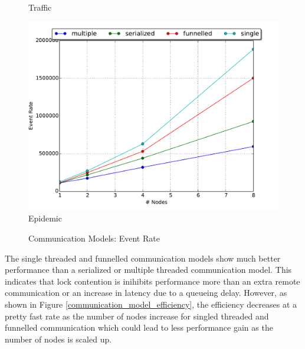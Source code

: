 \documentclass[11pt]{book}
\begin{document}
\begin{figure}
\begin{minipage}{.5\textwidth}
\begin{center}
      Traffic \\
    \end{center}
  \end{minipage}
  \centering
  \begin{minipage}{.5\textwidth}
    \begin{center}
      \includegraphics[width=\textwidth,keepaspectratio,quiet]{figs/partitioning_communication/communication_epidemic_eventrate.pdf} \\
      Epidemic \\
    \end{center}
  \end{minipage}
  \caption{Communication Models: Event Rate}\label{communication_model_eventrate}
\end{figure}

The single threaded and funnelled communication models show much better performance than a
serialized or multiple threaded communication model.  This indicates that lock contention is
inihibits performance more than an extra remote communication or an increase in latency due to a
queueing delay.  However, as shown in Figure \ref{communication_model_efficiency}, the efficiency
decreases at a pretty fast rate as the number of nodes increase for singled threaded and funnelled
communication which could lead to less performance gain as the number of nodes is scaled up.
\end{document}
